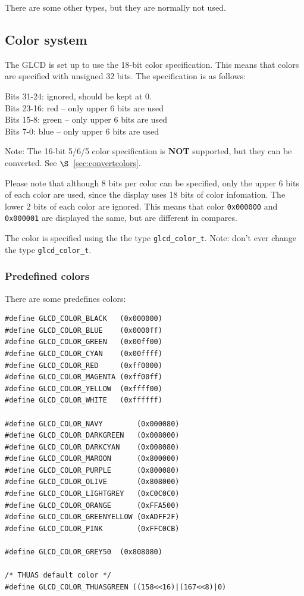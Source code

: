 \documentclass[12pt]{article}
\begin{document}
There are some other types, but they are normally not used.

\subsection{Color system}
The GLCD is set up to use the 18-bit color specification. This means that colors are specified with unsigned 32 bits. The specification is as follows:

Bits 31-24: ignored, should be kept at 0.\\
Bits 23-16: red -- only upper 6 bits are used\\
Bits 15-8: green -- only upper 6 bits are used\\
Bits 7-0: blue -- only upper 6 bits are used

Note: The 16-bit 5/6/5 color specification is \textbf{NOT} supported, but they can be converted. See $\S$~\ref{sec:convertcolors}.

Please note that although 8 bits per color can be specified, only the upper 6 bits of each color are used, since the display uses 18 bits of color infomation. The lower 2 bits of each color are ignored. This means that color \lstinline|0x000000| and \lstinline|0x000001| are displayed the same, but are different in compares.

The color is specified using the the type \lstinline|glcd_color_t|. Note: don't ever change the type \lstinline|glcd_color_t|.

\subsubsection{Predefined colors}
There are some predefines colors:

\begin{lstlisting}
#define GLCD_COLOR_BLACK   (0x000000)
#define GLCD_COLOR_BLUE    (0x0000ff)
#define GLCD_COLOR_GREEN   (0x00ff00)
#define GLCD_COLOR_CYAN    (0x00ffff)
#define GLCD_COLOR_RED     (0xff0000)
#define GLCD_COLOR_MAGENTA (0xff00ff)
#define GLCD_COLOR_YELLOW  (0xffff00)
#define GLCD_COLOR_WHITE   (0xffffff)

#define GLCD_COLOR_NAVY        (0x000080)
#define GLCD_COLOR_DARKGREEN   (0x008000)
#define GLCD_COLOR_DARKCYAN    (0x008080)
#define GLCD_COLOR_MAROON      (0x800000)
#define GLCD_COLOR_PURPLE      (0x800080)
#define GLCD_COLOR_OLIVE       (0x808000)
#define GLCD_COLOR_LIGHTGREY   (0xC0C0C0)
#define GLCD_COLOR_ORANGE      (0xFFA500)
#define GLCD_COLOR_GREENYELLOW (0xADFF2F)
#define GLCD_COLOR_PINK        (0xFFC0CB)

#define GLCD_COLOR_GREY50  (0x808080)

/* THUAS default color */
#define GLCD_COLOR_THUASGREEN ((158<<16)|(167<<8)|0)
\end{lstlisting}
\end{document}
